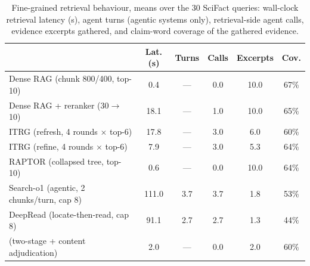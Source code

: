\begin{table}[t]
\centering
\footnotesize
\setlength{\tabcolsep}{3.6pt}
\caption{Fine-grained retrieval behaviour, means over the 30 SciFact queries:
wall-clock retrieval latency (s), agent turns (agentic systems only),
retrieval-side agent calls, evidence excerpts gathered, and claim-word coverage
of the gathered evidence.}
\label{tab:behavior}
\begin{tabular}{@{}lccccc@{}}
\toprule
& Lat.(s) & Turns & Calls & Excerpts & Cov. \\
\midrule
Dense RAG (chunk 800/400, top-10) & 0.4 & --- & 0.0 & 10.0 & 67\% \\
Dense RAG + reranker (30$\to$10) & 18.1 & --- & 1.0 & 10.0 & 65\% \\
ITRG (refresh, 4 rounds $\times$ top-6) & 17.8 & --- & 3.0 & 6.0 & 60\% \\
ITRG (refine, 4 rounds $\times$ top-6) & 7.9 & --- & 3.0 & 5.3 & 64\% \\
RAPTOR (collapsed tree, top-10) & 0.6 & --- & 0.0 & 10.0 & 64\% \\
Search-o1 (agentic, 2 chunks/turn, cap 8) & 111.0 & 3.7 & 3.7 & 1.8 & 53\% \\
DeepRead (locate-then-read, cap 8) & 91.1 & 2.7 & 2.7 & 1.3 & 44\% \\
\sys{} (two-stage + content adjudication) & 2.0 & --- & 0.0 & 2.0 & 60\% \\
\bottomrule
\end{tabular}
\end{table}

